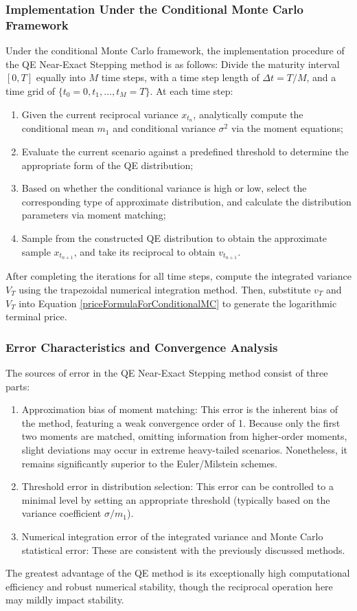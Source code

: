 \subsubsection{Implementation Under the Conditional Monte Carlo Framework}
Under the conditional Monte Carlo framework, the implementation procedure of the QE Near-Exact Stepping method is as follows:
Divide the maturity interval $[0,T]$ equally into $M$ time steps, with a time step length of $\Delta t = T/M$, and a time grid of $\{t_0=0,t_1,\ldots,t_M=T\}$. At each time step:
\begin{enumerate}
  \item Given the current reciprocal variance $x_{t_n}$, analytically compute the conditional mean $m_1$ and conditional variance $\sigma^2$ via the moment equations;
  \item Evaluate the current scenario against a predefined threshold to determine the appropriate form of the QE distribution;
  \item Based on whether the conditional variance is high or low, select the corresponding type of approximate distribution, and calculate the distribution parameters via moment matching;
  \item Sample from the constructed QE distribution to obtain the approximate sample $x_{t_{n+1}}$, and take its reciprocal to obtain $v_{t_{n+1}}$.
\end{enumerate}
After completing the iterations for all time steps, compute the integrated variance $V_T$ using the trapezoidal numerical integration method. Then, substitute $v_T$ and $V_T$ into Equation \eqref{priceFormulaForConditionalMC} to generate the logarithmic terminal price.

\subsubsection{Error Characteristics and Convergence Analysis}
The sources of error in the QE Near-Exact Stepping method consist of three parts:
\begin{enumerate}
  \item Approximation bias of moment matching: This error is the inherent bias of the method, featuring a weak convergence order of 1. Because only the first two moments are matched, omitting information from higher-order moments, slight deviations may occur in extreme heavy-tailed scenarios. Nonetheless, it remains significantly superior to the Euler/Milstein schemes.
  \item Threshold error in distribution selection: This error can be controlled to a minimal level by setting an appropriate threshold (typically based on the variance coefficient $\sigma/m_1$).
  \item Numerical integration error of the integrated variance and Monte Carlo statistical error: These are consistent with the previously discussed methods.
\end{enumerate}
The greatest advantage of the QE method is its exceptionally high computational efficiency and robust numerical stability, though the reciprocal operation here may mildly impact stability.

